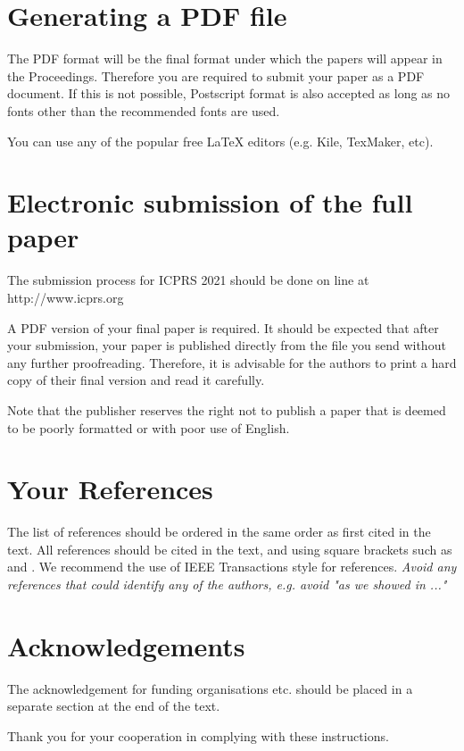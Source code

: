 \documentclass[10pt,twocolumn]{article}
\begin{document}
\section{Generating a {PDF} file}
The PDF format will be the final format under which the
papers will appear in the Proceedings. Therefore you are
required to submit your paper as a PDF document. If this is not
possible, Postscript format is also accepted as long as no fonts
other than the recommended fonts are used.

You can use any of the popular free LaTeX editors (e.g. Kile, TexMaker, etc).

\section{Electronic submission of the full paper}
The submission process for ICPRS 2021 should be done on
line at http://www.icprs.org

A PDF version of your final paper is required. It should
be expected that after your submission, your paper is
published directly from the file you send without any further
proofreading. Therefore, it is advisable for the authors to
print a hard copy of their final version and read it carefully.

Note that the publisher reserves the right not to publish a paper that is deemed to be poorly formatted or with poor use of English.

\section{Your References}
The list of references should be ordered in the same order as
first cited in the text. All references should be cited in the
text, and using square brackets such as \cite{ref01} and \cite{ref01,ref02}. We
recommend the use of IEEE Transactions style for references. \textit{Avoid any references
that could identify any of the authors, e.g. avoid "as we showed in ..."}

\section*{Acknowledgements}
The acknowledgement for funding organisations etc. should
be placed in a separate section at the end of the text.



Thank you for your cooperation in complying with these
instructions.



\end{document}
